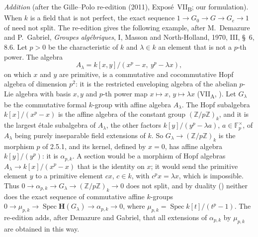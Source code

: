 \par\medskip\noindent
\emph{Addition} (after the Gille--Polo re-edition (2011),
Expos\'e~VII\textsubscript{B}; our formulation). When \(k\) is a field that is
not perfect, the exact sequence \(1\to G_0\to G\to G_e\to1\) of
 need not split. The re-edition gives the following example,
after M.~Demazure and P.~Gabriel, \emph{Groupes alg\'ebriques}, I, Masson and
North-Holland, 1970, III, \S~6, 8.6. Let \(p>0\) be the characteristic of
\(k\) and \(\lambda\in k\) an element that is not a \(p\)-th power. The
algebra
\[
  A_\lambda=k[x,y]/(x^p-x,\ y^p-\lambda x),
\]
on which \(x\) and \(y\) are primitive, is a commutative and
cocommutative Hopf algebra of dimension \(p^2\): it is the restricted
enveloping algebra of the abelian \(p\)-Lie algebra with basis \(x,y\)
and \(p\)-th power map \(x\mapsto x\), \(y\mapsto\lambda x\)
\textup{(VII\textsubscript{A}, )}. Let \(G_\lambda\) be the commutative formal
\(k\)-group with affine algebra \(A_\lambda\). The Hopf subalgebra
\(k[x]/(x^p-x)\) is the affine algebra of the constant group
\((\mathbb Z/p\mathbb Z)_k\), and it is the largest étale subalgebra of
\(A_\lambda\), the other factors \(k[y]/(y^p-\lambda a)\),
\(a\in\mathbb F_p^\times\), of \(A_\lambda\) being purely inseparable field
extensions of \(k\). So \(G_\lambda\to(\mathbb Z/p\mathbb Z)_k\) is the
morphism \(p\) of 2.5.1, and its kernel, defined by \(x=0\), has affine
algebra \(k[y]/(y^p)\): it is \(\alpha_{p,k}\). A section would be a
morphism of Hopf algebras \(A_\lambda\to k[x]/(x^p-x)\) that is the
identity on \(x\); it would send the primitive element \(y\) to a
primitive element \(cx\), \(c\in k\), with \(c^px=\lambda x\), which is
impossible. Thus \(0\to\alpha_{p,k}\to G_\lambda\to(\mathbb Z/p\mathbb Z)_k\to0\)
does not split, and by duality \textup{()} neither does the exact
sequence of commutative affine \(k\)-groups
\(0\to\mu_{p,k}\to\operatorname{Spec}\mathbf H(G_\lambda)\to\alpha_{p,k}\to0\),
where \(\mu_{p,k}=\operatorname{Spec}k[t]/(t^p-1)\). The re-edition adds,
after Demazure and Gabriel, that all extensions of \(\alpha_{p,k}\) by
\(\mu_{p,k}\) are obtained in this way.
